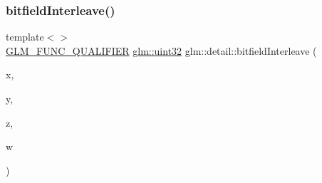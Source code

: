 \mbox{\label{namespaceglm_1_1detail_ae3f57ec9a2b938eb31978ccb99f85474}} 
\subsubsection{\texorpdfstring{bitfield\+Interleave()}{bitfieldInterleave()}\hspace{0.1cm}{\footnotesize\ttfamily [10/11]}}
{\footnotesize\ttfamily template$<$$>$ \\
\mbox{\hyperlink{setup_8hpp_a33fdea6f91c5f834105f7415e2a64407}{G\+L\+M\+\_\+\+F\+U\+N\+C\+\_\+\+Q\+U\+A\+L\+I\+F\+I\+ER}} \mbox{\hyperlink{group__gtc__type__precision_ga202b6a53c105fcb7e531f9b443518451}{glm\+::uint32}} glm\+::detail\+::bitfield\+Interleave (\begin{DoxyParamCaption}\item[{\mbox{\hyperlink{group__gtc__type__precision_ga1a7dcd8aac97cc8020817c94049deff2}{glm\+::uint8}}}]{x,  }\item[{\mbox{\hyperlink{group__gtc__type__precision_ga1a7dcd8aac97cc8020817c94049deff2}{glm\+::uint8}}}]{y,  }\item[{\mbox{\hyperlink{group__gtc__type__precision_ga1a7dcd8aac97cc8020817c94049deff2}{glm\+::uint8}}}]{z,  }\item[{\mbox{\hyperlink{group__gtc__type__precision_ga1a7dcd8aac97cc8020817c94049deff2}{glm\+::uint8}}}]{w }\end{DoxyParamCaption})}

\mbox{\label{namespaceglm_1_1detail_a3ed141c5adbf2e1209ffe2081d98ba4c}} 
